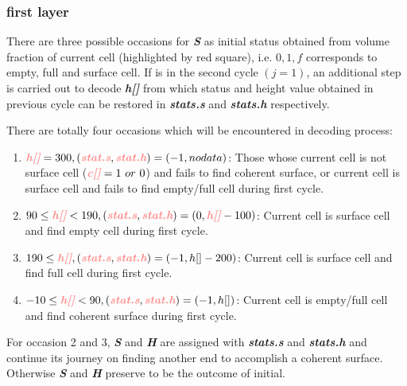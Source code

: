 \documentclass[a4paper]{article}
\newcommand{\para}[1]{\textbf{\emph{\textcolor{para}{#1}}}}
\begin{document}
\subsubsection{first layer}
There are three possible occasions for \para{S} as initial status obtained from volume fraction of current cell (highlighted by red square), i.e. $0,1,f$ corresponds to empty, full and surface cell. If is in the second cycle $(j=1)$, an additional step is carried out to decode \para{h[]} from which status and height value obtained in previous cycle can be restored in \para{stats.s} and \para{stats.h} respectively.\par
There are totally four occasions which will be encountered in decoding process:
\begin{enumerate}
    \item $\para{h[]}=300,(\para{stat.s},\para{stat.h})=(-1,nodata)$: Those whose current cell is not surface cell ($\para{c[]}=1\ or\ 0$) and fails to find coherent surface, or current cell is surface cell and fails to find empty/full cell during first cycle.
    \item $90\leq\para{h[]}<190,(\para{stat.s},\para{stat.h})=(0,\para{h[]}-100)$: Current cell is surface cell and find empty cell during first cycle.
    \item $190\leq\para{h[]},(\para{stat.s},\para{stat.h})=(-1,h[]-200)$: Current cell is surface cell and find full cell during first cycle.
    \item $-10\leq\para{h[]}<90,(\para{stat.s},\para{stat.h})=(-1,h[])$: Current cell is empty/full cell and find coherent surface during first cycle.    
\end{enumerate}
For occasion 2 and 3, \para{S} and \para{H} are assigned with \para{stats.s} and \para{stats.h} and continue its journey on finding another end to accomplish a coherent surface. Otherwise \para{S} and \para{H} preserve to be the outcome of initial.
\end{document}
